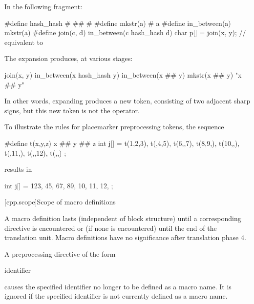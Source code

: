 \documentclass{wg21}
\newcommand{\clb}[1]{\removed{#1} \added{\grammarterm{line-break}}}
\begin{document}
\pnum
\begin{example}
    In the following fragment:

    \begin{codeblock}
        #define hash_hash # ## #
        #define mkstr(a) # a
        #define in_between(a) mkstr(a)
        #define join(c, d) in_between(c hash_hash d)
        char p[] = join(x, y);          // equivalent to 
    \end{codeblock}

    The expansion produces, at various stages:

    \begin{codeblock}
        join(x, y)
        in_between(x hash_hash y)
        in_between(x ## y)
        mkstr(x ## y)
        "x ## y"
    \end{codeblock}

    In other words, expanding  produces a new token,
    consisting of two adjacent sharp signs, but this new token is not the
    \tcode{\#\#} operator.
\end{example}

\pnum
\begin{example}
    To illustrate the rules for placemarker preprocessing tokens, the sequence
    \begin{codeblock}
        #define t(x,y,z) x ## y ## z
        int j[] = { t(1,2,3), t(,4,5), t(6,,7), t(8,9,),
            t(10,,), t(,11,), t(,,12), t(,,) };
    \end{codeblock}
    results in
    \begin{codeblock}
        int j[] = { 123, 45, 67, 89,
            10, 11, 12, };
    \end{codeblock}
\end{example}

[cpp.scope]{Scope of macro definitions}%
%

\pnum
A macro definition lasts
(independent of block structure)
until a corresponding
directive is encountered or
(if none is encountered)
until the end of the translation unit.
Macro definitions have no significance after translation phase 4.

\pnum
A preprocessing directive of the form
\begin{ncsimplebnf}
     identifier \clb{new-line}
\end{ncsimplebnf}
causes the specified identifier no longer to be defined as a macro name.
It is ignored if the specified identifier is not currently defined as
a macro name.
\end{document}
